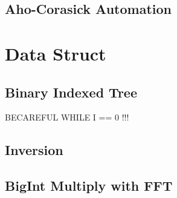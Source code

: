 \documentclass[a4paper]{article}
\begin{document}
\subsection {Aho-Corasick Automation}

\section{Data Struct}
\subsection {Binary Indexed Tree}
BECAREFUL WHILE I == 0 !!!

\subsection {Inversion}

\subsection {BigInt Multiply with FFT}

\end{document}

